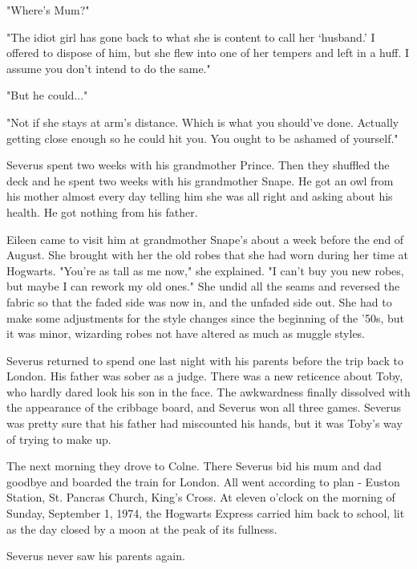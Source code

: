 \documentclass[a4paper,11pt]{article}
\begin{document}
"Where's Mum?"

"The idiot girl has gone back to what she is content to call her `husband.' I offered to dispose of him, but she flew into one of her tempers and left in a huff. I assume you don't intend to do the same."

"But he could..."

"Not if she stays at arm's distance. Which is what you should've done. Actually getting close enough so he could hit you. You ought to be ashamed of yourself."

Severus spent two weeks with his grandmother Prince. Then they shuffled the deck and he spent two weeks with his grandmother Snape. He got an owl from his mother almost every day telling him she was all right and asking about his health. He got nothing from his father.

Eileen came to visit him at grandmother Snape's about a week before the end of August. She brought with her the old robes that she had worn during her time at Hogwarts. "You're as tall as me now," she explained. "I can't buy you new robes, but maybe I can rework my old ones." She undid all the seams and reversed the fabric so that the faded side was now in, and the unfaded side out. She had to make some adjustments for the style changes since the beginning of the '50s, but it was minor, wizarding robes not have altered as much as muggle styles.

Severus returned to spend one last night with his parents before the trip back to London. His father was sober as a judge. There was a new reticence about Toby, who hardly dared look his son in the face. The awkwardness finally dissolved with the appearance of the cribbage board, and Severus won all three games. Severus was pretty sure that his father had miscounted his hands, but it was Toby's way of trying to make up.

The next morning they drove to Colne. There Severus bid his mum and dad goodbye and boarded the train for London. All went according to plan - Euston Station, St. Pancras Church, King's Cross. At eleven o'clock on the morning of Sunday, September 1, 1974, the Hogwarts Express carried him back to school, lit as the day closed by a moon at the peak of its fullness.

Severus never saw his parents again.
\end{document}
